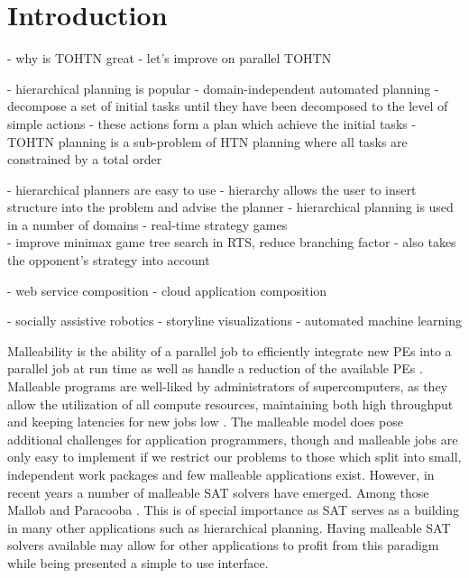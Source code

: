 \documentclass[enabledeprecatedfontcommands,12pt,a4paper,twoside]{scrartcl}
\numberwithin{equation}{section}
\begin{document}
\clearpage


\listoffigures
\listoftables
\listofalgorithms

\clearpage


\section{Introduction}
- why is TOHTN great
- let's improve on parallel TOHTN

- hierarchical planning is popular
- domain-independent automated planning
- decompose a set of initial tasks until they have been decomposed to the level of simple actions
- these actions form a plan which achieve the initial tasks
- TOHTN planning is a sub-problem of HTN planning where all tasks are constrained by a total order

- hierarchical planners are easy to use
- hierarchy allows the user to insert structure into the problem and advise the planner
- hierarchical planning is used in a number of domains
	- \cite{munoz2004role} real-time strategy games\\
	- \cite{ontanon2015adversarial} improve minimax game tree search in RTS, reduce branching factor
	- \cite{lin2020htn} also takes the opponent's strategy into account
	
	- \cite{sirin2004htn} web service composition
	- \cite{georgievski2017cloud} cloud application composition
	
	- \cite{gonzalez2017three} socially assistive robotics
	- \cite{padia2018yarn} storyline visualizations
	- \cite{mohr2018ml} automated machine learning

Malleability is the ability of a parallel job to efficiently integrate new PEs into a parallel job at run time as well as handle a reduction of the available PEs \cite{feitelson1997job}. Malleable programs are well-liked by administrators of supercomputers, as they allow the utilization of all compute resources, maintaining both high throughput and keeping latencies for new jobs low \cite{feitelson1997job, hungershofer2004combined}. The malleable model does pose additional challenges for application programmers, though and malleable jobs are only easy to implement if we restrict our problems to those which split into small, independent work packages \cite{feitelson1997job, tucker1989process} and few malleable applications exist. 
However, in recent years a number of malleable SAT solvers have emerged. Among those Mallob \cite{sanders2022decentralized} and Paracooba \cite{heisinger2020distributed}. This is of special importance as SAT serves as a building in many other applications such as hierarchical planning. Having malleable SAT solvers available may allow for other applications to profit from this paradigm while being presented a simple to use interface. \\
\end{document}
